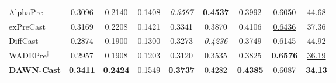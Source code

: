 \begin{table}[t]
{\begin{tabular}{l|cccccccc}
AlphaPre & 0.3096 & 0.2140 & 0.1408 & \textit{0.3597} & \textbf{0.4537} & 0.3992 & 0.6050 & 44.68 \\
exPreCast & 0.3169 & 0.2208 & 0.1421 & 0.3341 & 0.3870 & 0.4106 & \underline{0.6436} & 37.36 \\
DiffCast & 0.2874 & 0.1900 & 0.1300 & 0.3273 & \textit{0.4236} & 0.3749 & 0.6145 & 44.92 \\
WADEPre$^{\dagger}$ & 0.2957 & 0.1908 & 0.1203 & 0.3120 & 0.3535 & 0.3825 & \textbf{0.6576} & \underline{36.19} \\
\textbf{DAWN-Cast} & \textbf{0.3411} & \textbf{0.2424} & \underline{0.1549} & \textbf{0.3737} & \underline{0.4282} & \textbf{0.4385} & 0.6087 & \textbf{34.13} \\
\bottomrule
\end{tabular}}
\end{table}
